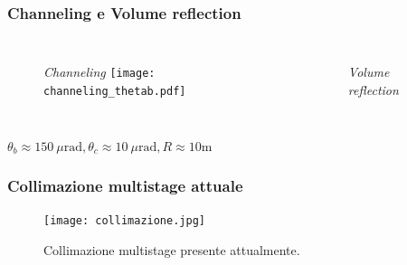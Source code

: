\documentclass[10pt]{beamer}
\begin{document}
\begin{frame}
\frametitle{Channeling e Volume reflection}
\begin{columns}[c] %

\begin{figure}
    {\footnotesize \itshape Channeling\vspace*{0.5cm}}
%   
\texttt{[image: channeling\_thetab.pdf]}
\end{figure}

\begin{figure}
    {\footnotesize \itshape Volume reflection\vspace*{0.5cm}}
    \def\svgwidth{0.9\textwidth} %
    
\end{figure}
\end{columns}
\begin{center}
$\theta_b \approx 150\ \mu\textrm{rad}, \theta_c \approx 10\ \mu\textrm{rad}, R \approx 10 \textrm{m}$
\end{center}
\end{frame}


\begin{frame}
\frametitle{Collimazione multistage attuale}

\begin{figure}
\texttt{[image: collimazione.jpg]}
\caption{Collimazione multistage presente attualmente.}
\end{figure}

\end{frame}



% 
% 
% 
%     
% 
\end{document}

